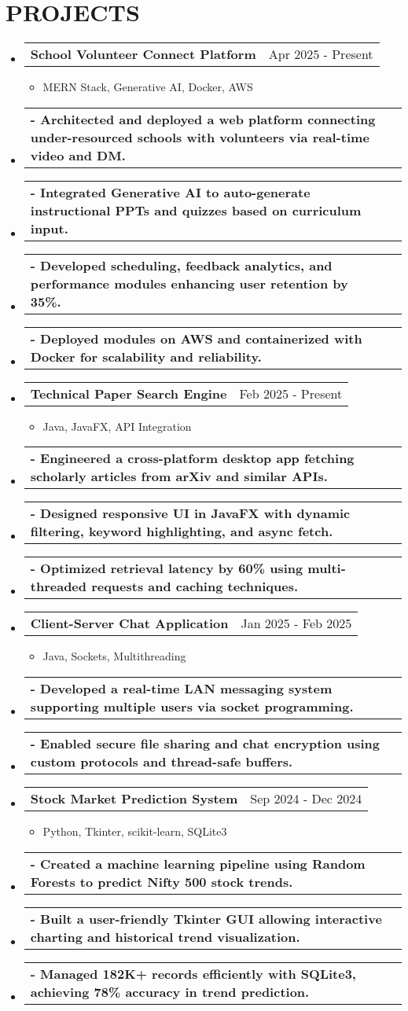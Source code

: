\documentclass[letterpaper,11pt]{article}
\makeatletter
\newcommand{\resumeItem}[1]{
  \item\small{#1}
}
\newcommand{\resumeProjectHeading}[2]{
  \item
    \begin{tabular*}{0.97\textwidth}[t]{l@{\extracolsep{\fill}}r}
      \small\textbf{#1} & \small{#2} \\
    \end{tabular*}\vspace{-5pt}
}
\newcommand{\resumeSubHeadingListStart}{\begin{itemize}[leftmargin=0.15in, label={}]}
\newcommand{\resumeSubHeadingListEnd}{\end{itemize}}
\newcommand{\resumeItemListStart}{\begin{itemize}[leftmargin=0.25in, label=\textbullet]}
\newcommand{\resumeItemListEnd}{\end{itemize}\vspace{-5pt}}
\makeatother
\begin{document}
\section{PROJECTS}
\resumeSubHeadingListStart
\resumeProjectHeading{School Volunteer Connect Platform}{Apr 2025 - Present}
\resumeItemListStart
\resumeItem{MERN Stack, Generative AI, Docker, AWS}
\resumeItemListEnd
\resumeProjectHeading{- Architected and deployed a web platform connecting under-resourced schools with volunteers via real-time video and DM.}{}
\resumeProjectHeading{- Integrated Generative AI to auto-generate instructional PPTs and quizzes based on curriculum input.}{}
\resumeProjectHeading{- Developed scheduling, feedback analytics, and performance modules enhancing user retention by 35\%.}{}
\resumeProjectHeading{- Deployed modules on AWS and containerized with Docker for scalability and reliability.}{}
\resumeProjectHeading{Technical Paper Search Engine}{Feb 2025 - Present}
\resumeItemListStart
\resumeItem{Java, JavaFX, API Integration}
\resumeItemListEnd
\resumeProjectHeading{- Engineered a cross-platform desktop app fetching scholarly articles from arXiv and similar APIs.}{}
\resumeProjectHeading{- Designed responsive UI in JavaFX with dynamic filtering, keyword highlighting, and async fetch.}{}
\resumeProjectHeading{- Optimized retrieval latency by 60\% using multi-threaded requests and caching techniques.}{}
\resumeProjectHeading{Client-Server Chat Application}{Jan 2025 - Feb 2025}
\resumeItemListStart
\resumeItem{Java, Sockets, Multithreading}
\resumeItemListEnd
\resumeProjectHeading{- Developed a real-time LAN messaging system supporting multiple users via socket programming.}{}
\resumeProjectHeading{- Enabled secure file sharing and chat encryption using custom protocols and thread-safe buffers.}{}
\resumeProjectHeading{Stock Market Prediction System}{Sep 2024 - Dec 2024}
\resumeItemListStart
\resumeItem{Python, Tkinter, scikit-learn, SQLite3}
\resumeItemListEnd
\resumeProjectHeading{- Created a machine learning pipeline using Random Forests to predict Nifty 500 stock trends.}{}
\resumeProjectHeading{- Built a user-friendly Tkinter GUI allowing interactive charting and historical trend visualization.}{}
\resumeProjectHeading{- Managed 182K+ records efficiently with SQLite3, achieving 78\% accuracy in trend prediction.}{}
\resumeSubHeadingListEnd
\end{document}
